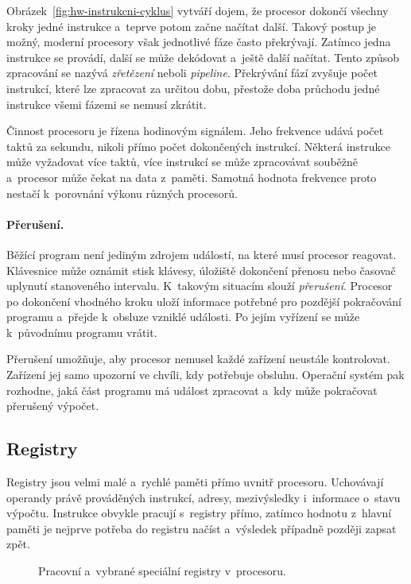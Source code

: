Obrázek~\ref{fig:hw-instrukcni-cyklus} vytváří dojem, že procesor dokončí všechny kroky jedné instrukce a~teprve potom začne načítat další. Takový postup je možný, moderní procesory však jednotlivé fáze často překrývají. Zatímco jedna instrukce se provádí, další se může dekódovat a~ještě další načítat. Tento způsob zpracování se nazývá \emph{zřetězení} neboli \emph{pipeline}. Překrývání fází zvyšuje počet instrukcí, které lze zpracovat za určitou dobu, přestože doba průchodu jedné instrukce všemi fázemi se nemusí zkrátit.

Činnost procesoru je řízena hodinovým signálem. Jeho frekvence udává počet taktů za sekundu, nikoli přímo počet dokončených instrukcí. Některá instrukce může vyžadovat více taktů, více instrukcí se může zpracovávat souběžně a~procesor může čekat na data z~paměti. Samotná hodnota frekvence proto nestačí k~porovnání výkonu různých procesorů.

\paragraph{Přerušení.}

Běžící program není jediným zdrojem událostí, na které musí procesor reagovat. Klávesnice může oznámit stisk klávesy, úložiště dokončení přenosu nebo časovač uplynutí stanoveného intervalu. K~takovým situacím slouží \emph{přerušení}. Procesor po dokončení vhodného kroku uloží informace potřebné pro pozdější pokračování programu a~přejde k~obsluze vzniklé události. Po jejím vyřízení se může k~původnímu programu vrátit.

Přerušení umožňuje, aby procesor nemusel každé zařízení neustále kontrolovat. Zařízení jej samo upozorní ve chvíli, kdy potřebuje obsluhu. Operační systém pak rozhodne, jaká část programu má událost zpracovat a~kdy může pokračovat přerušený výpočet.

\subsection{Registry}\label{subsec:hw-registry}

Registry jsou velmi malé a~rychlé paměti přímo uvnitř procesoru. Uchovávají operandy právě prováděných instrukcí, adresy, mezivýsledky i~informace o~stavu výpočtu. Instrukce obvykle pracují s~registry přímo, zatímco hodnotu z~hlavní paměti je nejprve potřeba do registru načíst a~výsledek případně později zapsat zpět.

\begin{figure}[ht]
    \centering
    
    \caption{Pracovní a~vybrané speciální registry v~procesoru.}
    \label{fig:hw-registry}
\end{figure}

